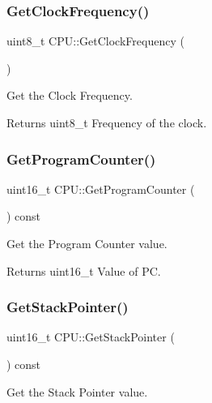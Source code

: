 \subsubsection{\texorpdfstring{Get\+Clock\+Frequency()}{GetClockFrequency()}}
{\footnotesize\ttfamily uint8\+\_\+t C\+P\+U\+::\+Get\+Clock\+Frequency (\begin{DoxyParamCaption}{ }\end{DoxyParamCaption})}



Get the Clock Frequency. 

\begin{DoxyReturn}{Returns}
uint8\+\_\+t Frequency of the clock. 
\end{DoxyReturn}
\mbox{\label{classCPU_a7882dfef1d06166e828f917368493625}} 
\subsubsection{\texorpdfstring{Get\+Program\+Counter()}{GetProgramCounter()}}
{\footnotesize\ttfamily uint16\+\_\+t C\+P\+U\+::\+Get\+Program\+Counter (\begin{DoxyParamCaption}{ }\end{DoxyParamCaption}) const}



Get the Program Counter value. 

\begin{DoxyReturn}{Returns}
uint16\+\_\+t Value of PC. 
\end{DoxyReturn}
\mbox{\label{classCPU_a570d34ada158ddb45f8ba8dc0e5f218a}} 
\subsubsection{\texorpdfstring{Get\+Stack\+Pointer()}{GetStackPointer()}}
{\footnotesize\ttfamily uint16\+\_\+t C\+P\+U\+::\+Get\+Stack\+Pointer (\begin{DoxyParamCaption}{ }\end{DoxyParamCaption}) const}



Get the Stack Pointer value. 

